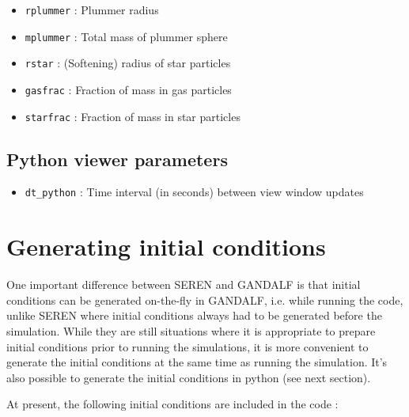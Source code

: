 \documentclass[a4paper]{article}
\newcommand{\var}[1]{\texttt{#1}}
\begin{document}
\begin{itemize}
\item \var{rplummer}     : Plummer radius
\item \var{mplummer}     : Total mass of plummer sphere

\item \var{rstar}        : (Softening) radius of star particles

\item \var{gasfrac}      : Fraction of mass in gas particles
\item \var{starfrac}     : Fraction of mass in star particles

\end{itemize}


\subsection{Python viewer parameters}

\begin{itemize}

\item \var{dt\_python} : Time interval (in seconds) between view window updates

\end{itemize}


\newpage




\section{Generating initial conditions}

One important difference between SEREN and GANDALF is that initial conditions can be generated on-the-fly in GANDALF, i.e. while running the code, unlike SEREN where initial conditions always had to be generated before the simulation.  While they are still situations where it is appropriate to prepare initial conditions prior to running the simulations, it is more convenient to generate the initial conditions at the same time as running the simulation. It's also possible to generate the initial conditions in python (see next section).

At present, the following initial conditions are included in the code : \newline
\end{document}
